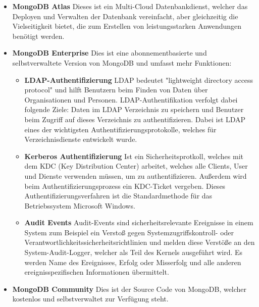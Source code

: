 \begin{itemize}
    \item \textbf{MongoDB Atlas}
        \newline
        Dieses ist ein Multi-Cloud Datenbankdienst, welcher das Deployen und Verwalten der Datenbank vereinfacht, aber gleichzeitig die Vielseitigkeit bietet, die zum Erstellen von leistungsstarken Anwendungen benötigt werden.
    \item \textbf{MongoDB Enterprise}
        \newline
        Dies ist eine abonnementbasierte und selbstverwaltete Version von MongoDB und umfasst mehr Funktionen:
        \begin{itemize}
            \item \textbf{LDAP-Authentifizierung}
                \newline
                LDAP bedeutet "lightweight directory access protocol" und hilft Benutzern beim Finden von Daten über Organisationen und Personen. LDAP-Authentifikation verfolgt dabei folgende Ziele: Daten im LDAP Verzeichnis zu speichern und Benutzer beim Zugriff auf dieses Verzeichnis zu authentifizieren. Dabei ist LDAP eines der wichtigsten Authentifizierungsprotokolle, welches für Verzeichnisdienste entwickelt wurde.
                \cite{ldap_auth}
            \item \textbf{Kerberos Authentifizierung}
                \newline
                Ist ein Sicherheitsprotkoll, welches mit dem KDC (Key Distribution Center) arbeitet, welches alle Clients, User und Dienste verwenden müssen, um zu authentifizieren. Außerdem wird beim Authentifizierungsprozess ein KDC-Ticket vergeben. Dieses Authentifizierungsverfahren ist die Standardmethode für das Betriebssystem Microsoft Windows.
                \cite{kerberos_auth}
            \item \textbf{Audit Events}
                \newline
                Audit-Events sind sicherheitsrelevante Ereignisse in einem System zum Beispiel ein Verstoß gegen Systemzugriffskontroll- oder Verantwortlichkeitssicherheitsrichtlinien und melden diese Verstöße an den System-Audit-Logger, welcher als Teil des Kernels ausgeführt wird. Es werden Name des Ereignisses, Erfolg oder Misserfolg und alle anderen ereignisspezifischen Informationen übermittelt.
                \cite{audit_events}
\end{itemize}
    \item \textbf{MongoDB Community}
        \newline
        Dies ist der Source Code von MongoDB, welcher kostenlos und selbstverwaltet zur Verfügung steht.
\end{itemize}
\cite{mongodb_basics}

